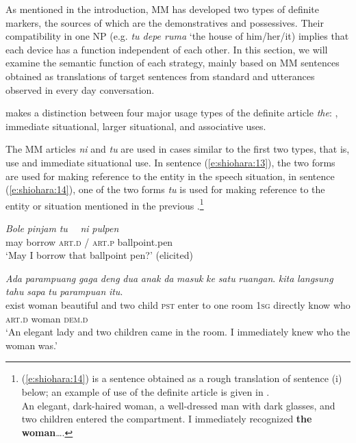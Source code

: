 \documentclass[output=paper
,modfonts
,nonflat]{langsci/langscibook}
\begin{document}
As mentioned in the introduction, MM has developed two types of definite markers, the sources of which are the demonstratives and possessives. Their compatibility in one NP (e.g. \textit{tu depe ruma} ‘the house of him/her/it) implies that each device has a function independent of each other. In this section, we will examine the semantic function of each strategy, mainly based on MM sentences obtained as translations of target sentences from standard  and utterances observed in every day conversation.

\citet[Chapter 3]{Hawkins2015} makes a distinction between four major usage types of the definite article \textit{the}: , immediate situational, larger situational, and associative  uses. 

The MM articles \textit{ni} and \textit{tu} are used in cases similar to the first two types, that is,  use and immediate situational use. In sentence (\ref{e:shiohara:13}), the two forms are used for making reference to the entity in the speech situation, in sentence (\ref{e:shiohara:14}), one of the two forms \textit{tu} is used for making reference to the entity or situation mentioned in the previous .\footnote{(\ref{e:shiohara:14}) is a sentence obtained as a rough translation of sentence (i) below; an example of  use of the  definite article is given in \citet[3]{Lyons1999}.\\\ea An elegant, dark-haired woman, a well-dressed man with dark glasses, and two children entered the compartment. I immediately recognized \textbf{the woman}….\z}

\begin{exe}
	\ex\label{e:shiohara:13}
	\gll \textit{Bole}  \textit{pinjam}  \textit{tu}　{ } {{\USSlash}} \textit{ni}  \textit{pulpen}{\USQMark}\\
	may  borrow  \textsc{art.d} {/} \textsc{art.p}  ballpoint.pen\\
	\glt ‘May I borrow that ballpoint pen?’ \hfill{(elicited)}
\end{exe}

\begin{exe}
	\ex\label{e:shiohara:14}
	\gll \textit{Ada} \textit{parampuang} \textit{gaga} \textit{deng} \textit{dua} \textit{anak} \textit{da} \textit{masuk} \textit{ke} \textit{satu} \textit{ruangan}. \textit{kita} \textit{langsung} \textit{tahu} \textit{sapa} \textit{tu} \textit{parampuan} \textit{itu}.\\
	exist woman beautiful  and two child \textsc{pst} enter to one room \textsc{1sg} directly know who \textsc{art.d} woman \textsc{dem.d}\\
	\glt ‘An elegant lady and two children came in the room. I immediately knew who the woman was.’
\end{exe}
\end{document}

